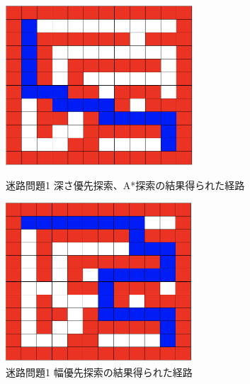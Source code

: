 \documentclass[uplatex]{jsarticle}
\begin{document}
\begin{figure}[htbp]
 \begin{minipage}{0.5\hsize}
  \begin{center}
   \includegraphics[width=70mm]{img/maze_1_dfs_astar.png}
  \end{center}
  \caption{迷路問題1 深さ優先探索、A*探索の結果得られた経路}
  \label{fig:one}
 \end{minipage}
 \begin{minipage}{0.5\hsize}
  \begin{center}
   \includegraphics[width=70mm]{img/maze_1_bfs.png}
  \end{center}
  \caption{迷路問題1 幅優先探索の結果得られた経路}
  \label{fig:two}
 \end{minipage}
\end{figure}
\end{document}
